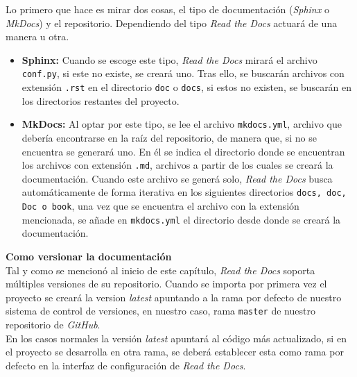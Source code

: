 Lo primero que hace es mirar dos cosas, el tipo de documentación (\emph{Sphinx} o \emph{MkDocs}) y el repositorio. Dependiendo del tipo \emph{Read the Docs} actuará de una manera u otra.
\begin{itemize}
    \item \textbf{Sphinx: } Cuando se escoge este tipo, \emph{Read the Docs} mirará el archivo \texttt{conf.py}, si este no existe, se creará uno. Tras ello, se buscarán archivos con extensión \texttt{.rst} en el directorio \texttt{doc} o \texttt{docs}, si estos no existen, se buscarán en los directorios restantes del proyecto.
    \item \textbf{MkDocs: } Al optar por este tipo, se lee el archivo \texttt{mkdocs.yml}, archivo que debería encontrarse en la raíz del repositorio, de manera que, si no se encuentra se generará uno. En él se indica el directorio donde se encuentran los archivos con extensión \texttt{.md}, archivos a partir de los cuales se creará la documentación.
    Cuando este archivo se generá solo, \emph{Read the Docs} busca automáticamente de forma iterativa en los siguientes directorios \texttt{docs, doc, Doc o book}, una vez que se encuentra el archivo con la extensión mencionada, se añade en \texttt{mkdocs.yml} el directorio desde donde se creará la documentación.
\end{itemize}
\textbf{Como versionar la documentación} \\
Tal y como se mencionó al inicio de este capítulo, \emph{Read the Docs} soporta múltiples versiones de su repositorio. Cuando se importa por primera vez el proyecto se creará la version \emph{latest} apuntando a la rama por defecto de nuestro sistema de control de versiones, en nuestro caso, rama \texttt{master} de nuestro repositorio de \emph{GitHub}. \\
En los casos normales la versión \emph{latest} apuntará al código más actualizado, si en el proyecto se desarrolla en otra rama, se deberá establecer esta como rama por defecto en la interfaz de configuración de \emph{Read the Docs}. \\

